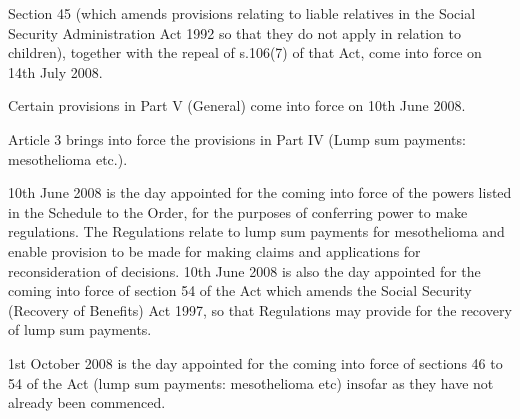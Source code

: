 \documentclass[12pt,a4paper]{article}
\begin{document}
Section 45 (which amends provisions relating to liable relatives in the Social Security Administration Act 1992 so that they do not apply in relation to children), together with the repeal of s.106(7) of that Act, come into force on 14th July 2008.

Certain provisions in Part V (General) come into force on 10th June 2008.

Article 3 brings into force the provisions in Part IV (Lump sum payments: mesothelioma etc.).

10th June 2008 is the day appointed for the coming into force of the powers listed in the Schedule to the Order, for the purposes of conferring power to make regulations. The Regulations relate to lump sum payments for mesothelioma and enable provision to be made for making claims and applications for reconsideration of decisions. 10th June 2008 is also the day appointed for the coming into force of section 54 of the Act which amends the Social Security (Recovery of Benefits) Act 1997, so that Regulations may provide for the recovery of lump sum payments.

1st October 2008 is the day appointed for the coming into force of sections 46 to 54 of the Act (lump sum payments: mesothelioma etc) insofar as they have not already been commenced. 
\end{document}
